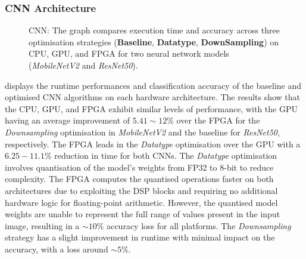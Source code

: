 \subsubsection{CNN Architecture}




\begin{figure}[h]
    \centering
\resizebox{\columnwidth}{!}{}    %
    \caption[CNN: Comparison Runtime \& Accuracy]{CNN: The graph compares execution time and accuracy across three optimisation strategies (\textbf{Baseline}, \textbf{Datatype}, \textbf{DownSampling}) on CPU, GPU, and FPGA for two neural network models (\textit{MobileNetV2} and \textit{ResNet50}).   }
    \label{fig:CNNExecutionTime}
\end{figure}



 displays the runtime performances and classification accuracy of the baseline and optimised CNN algorithms on each hardware architecture. The results show that the CPU, GPU, and FPGA exhibit similar levels of performance, with the GPU having an average improvement of $5.41\sim12\%$ over the FPGA for the \textit{Downsampling} optimisation in \textit{MobileNetV2} and the baseline for \textit{ResNet50}, respectively. The FPGA leads in the \textit{Datatype} optimisation over the GPU with a $6.25-11.1\%$ reduction in time for both CNNs. The \textit{Datatype} optimisation involves quantisation of the model's weights from FP32 to 8-bit to reduce complexity. The FPGA computes the quantised operations faster on both architectures due to exploiting the DSP blocks and requiring no additional hardware logic for floating-point arithmetic. However, the quantised model weights are unable to represent the full range of values present in the input image, resulting in a $\sim10\%$ accuracy loss for all platforms. The \textit{Downsampling} strategy has a slight improvement in runtime with minimal impact on the accuracy, with a loss around $\sim5\%$.


